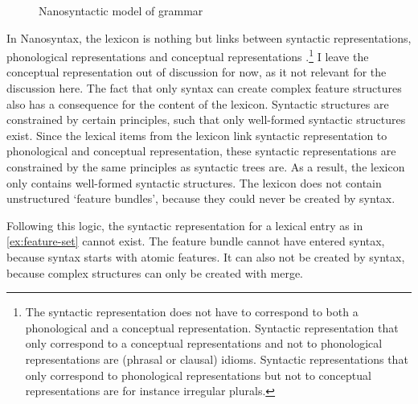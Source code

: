 \begin{figure}[ht]
  \centering
  \caption{Nanosyntactic model of grammar}
  \label{fig:nano}
\end{figure}

In Nanosyntax, the lexicon is nothing but links between syntactic representations, phonological representations and conceptual representations \citep{starke2014}.\footnote{
The syntactic representation does not have to correspond to both a phonological and a conceptual representation. Syntactic representation that only correspond to a conceptual representations and not to phonological representations are (phrasal or clausal) idioms. Syntactic representations that only correspond to phonological representations but not to conceptual representations are for instance irregular plurals.
}
I leave the conceptual representation out of discussion for now, as it not relevant for the discussion here. The fact that only syntax can create complex feature structures also has a consequence for the content of the lexicon.
Syntactic structures are constrained by certain principles, such that only well-formed syntactic structures exist. Since the lexical items from the lexicon link syntactic representation to phonological and conceptual representation, these syntactic representations are constrained by the same principles as syntactic trees are. As a result, the lexicon only contains well-formed syntactic structures. The lexicon does not contain unstructured `feature bundles', because they could never be created by syntax.

Following this logic, the syntactic representation for a lexical entry as in \ref{ex:feature-set} cannot exist. The feature bundle cannot have entered syntax, because syntax starts with atomic features. It can also not be created by syntax, because complex structures can only be created with merge.


